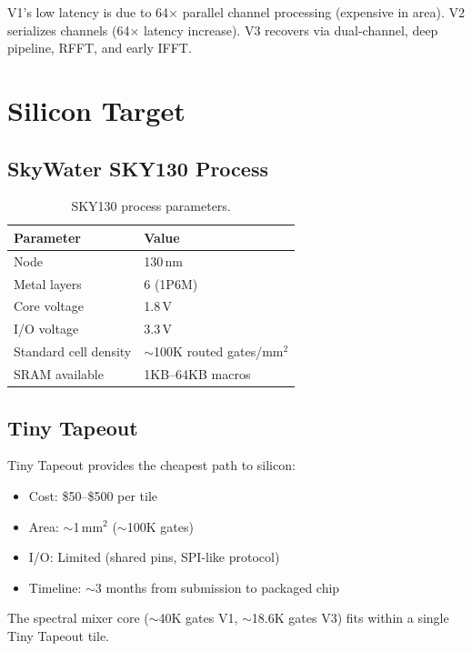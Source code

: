 \documentclass[11pt,a4paper]{article}
\theoremstyle{definition}
\theoremstyle{remark}
\begin{document}
V1's low latency is due to 64$\times$ parallel channel processing (expensive in
area). V2 serializes channels (64$\times$ latency increase). V3 recovers via
dual-channel, deep pipeline, RFFT, and early IFFT.

\section{Silicon Target}

\subsection{SkyWater SKY130 Process}

\begin{table}[h]
\centering
\caption{SKY130 process parameters.}
\label{tab:sky130}
\begin{tabular}{ll}
\toprule
\textbf{Parameter} & \textbf{Value} \\
\midrule
Node & 130\,nm \\
Metal layers & 6 (1P6M) \\
Core voltage & 1.8\,V \\
I/O voltage & 3.3\,V \\
Standard cell density & $\sim$100K routed gates/mm$^2$ \\
SRAM available & 1KB--64KB macros \\
\bottomrule
\end{tabular}
\end{table}

\subsection{Tiny Tapeout}

Tiny Tapeout provides the cheapest path to silicon:
\begin{itemize}[noitemsep]
  \item Cost: \$50--\$500 per tile
  \item Area: $\sim$1\,mm$^2$ ($\sim$100K gates)
  \item I/O: Limited (shared pins, SPI-like protocol)
  \item Timeline: $\sim$3 months from submission to packaged chip
\end{itemize}

The spectral mixer core ($\sim$40K gates V1, $\sim$18.6K gates V3) fits within a
single Tiny Tapeout tile.
\end{document}

